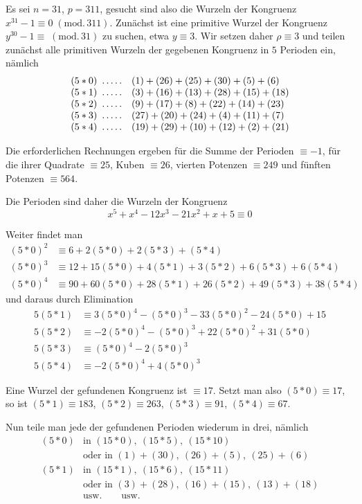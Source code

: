 Es sei $n=31$, $p=311$, gesucht sind also die Wurzeln der Kongruenz $x^{31}-1\equiv0\;(\mathrm{mod.}\,311)$. Zunächst ist eine primitive Wurzel der Kongruenz $y^{30}-1\equiv\;(\mathrm{mod.}\,31)$ zu suchen, etwa $y\equiv3$. Wir setzen daher $\rho\equiv3$ und teilen zunächst alle primitiven Wurzeln der gegebenen Kongruenz in $5$ Perioden ein, nämlich
\[
\begin{array}{rl}
(5\ast0)\ \mathinner{.\,.\,.\,.\,.}&(1)+(26)+(25)+(30)+(5)+(6)\\
(5\ast1)\ \mathinner{.\,.\,.\,.\,.}&(3)+(16)+(13)+(28)+(15)+(18)\\
(5\ast2)\ \mathinner{.\,.\,.\,.\,.}&(9)+(17)+(8)+(22)+(14)+(23)\\
(5\ast3)\ \mathinner{.\,.\,.\,.\,.}&(27)+(20)+(24)+(4)+(11)+(7)\\
(5\ast4)\ \mathinner{.\,.\,.\,.\,.}&(19)+(29)+(10)+(12)+(2)+(21)
\end{array}
\]

Die erforderlichen Rechnungen ergeben für die Summe der Perioden $\equiv-1$, für die ihrer Quadrate $\equiv25$, Kuben $\equiv26$, vierten Potenzen $\equiv249$ und fünften Potenzen $\equiv564$.

Die Perioden sind daher die Wurzeln der Kongruenz
\[
x^5+x^4-12x^3-21x^2+x+5\equiv0
\]

Weiter findet man
\[
\begin{aligned}
(5\ast0)^2&\equiv6+2(5\ast0)+2(5\ast3)+(5\ast4)\\
(5\ast0)^3&\equiv12+15(5\ast0)+4(5\ast1)+3(5\ast2)+6(5\ast3)+6(5\ast4)\\
(5\ast0)^4&\equiv90+60(5\ast0)+28(5\ast1)+26(5\ast2)+49(5\ast3)+38(5\ast4)
\end{aligned}
\]
und daraus durch Elimination
\[
\begin{aligned}
5(5\ast1)&\equiv3(5\ast0)^4-(5\ast0)^3-33(5\ast0)^2-24(5\ast0)+15\\
5(5\ast2)&\equiv-2(5\ast0)^4-(5\ast0)^3+22(5\ast0)^2+31(5\ast0)\\
5(5\ast3)&\equiv(5\ast0)^4-2(5\ast0)^3\\
5(5\ast4)&\equiv-2(5\ast0)^4+4(5\ast0)^3
\end{aligned}
\]

Eine Wurzel der gefundenen Kongruenz ist $\equiv17$. Setzt man also $(5\ast0)\equiv17$, so ist $(5\ast1)\equiv183$, $(5\ast2)\equiv263$, $(5\ast3)\equiv91$, $(5\ast4)\equiv67$.

Nun teile man jede der gefundenen Perioden wiederum in drei, nämlich
\[
\begin{array}{rl}
(5\ast0)&\text{in }(15\ast0),\ (15\ast5),\ (15\ast10)\\
&\text{oder in }(1)+(30),\ (26)+(5),\ (25)+(6)\\
(5\ast1)&\text{in }(15\ast1),\ (15\ast6),\ (15\ast11)\\
&\text{oder in }(3)+(28),\ (16)+(15),\ (13)+(18)\\
&\text{usw.}\qquad\text{usw.}
\end{array}
\]

